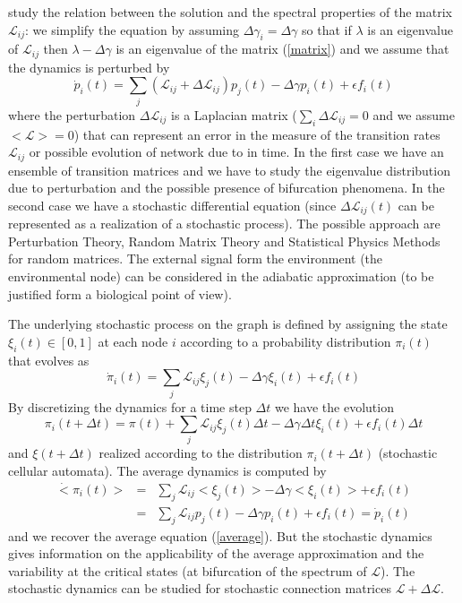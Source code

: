 study the relation between the solution and the spectral properties of the matrix $\mathcal{L}_{ij}$: we simplify the
equation by assuming $\Delta \gamma_i=\Delta \gamma$ so that if $\lambda$ is an eigenvalue of $\mathcal{L}_{ij}$
then $\lambda-\Delta \gamma$ is an eigenvalue of the matrix (\ref{matrix}) and we assume that the dynamics
is perturbed by
\begin{equation}
\dot p_i(t)=\sum_j\left ( \mathcal{L}_{ij}+\Delta \mathcal{L}_{ij}\right ) p_j(t)-\Delta \gamma p_i(t)+\epsilon f_i(t)
\label{average_p}
\end{equation}
where the perturbation $\Delta\mathcal{L}_{ij}$ is a Laplacian matrix ($\sum_i \Delta\mathcal{L}_{ij}=0$ and we
assume $<\mathcal{L}>=0$) that can
represent an error in the measure of the transition rates $\mathcal{L}_{ij}$ or possible evolution of network due to
in time. In the first case we have an ensemble of transition matrices and we have to study the eigenvalue distribution
due to perturbation and the possible presence of bifurcation phenomena. In the second case we have a stochastic 
differential equation (since $\Delta \mathcal{L}_{ij}(t)$ can be represented as a realization of a stochastic process).
The possible approach are Perturbation Theory, Random Matrix Theory and Statistical Physics Methods for random matrices.
The external signal form the environment  (the environmental node) can be considered in the adiabatic approximation
(to be justified form a biological point of view).\par\noindent
The underlying stochastic process on the graph is defined by assigning the state $\xi_i(t)\in [0,1]$ at each node $i$ according 
to a probability distribution $\pi_i(t)$ that evolves as
$$
\dot \pi_i(t)=\sum_j \mathcal{L}_{ij}\xi_j(t)-\Delta \gamma \xi_i(t)+\epsilon f_i(t)
$$
By discretizing the dynamics for a time step $\Delta t$ we have the evolution
$$
\pi_i(t+\Delta t)=\pi(t)+\sum_j \mathcal{L}_{ij}\xi_j(t)\Delta t-\Delta \gamma \Delta t\xi_i(t)+\epsilon f_i(t)\Delta t
$$
and $\xi(t+\Delta t)$ realized according to the distribution $\pi_i(t+\Delta t)$ (stochastic cellular automata).
The average dynamics is computed by
\begin{eqnarray}
\dot <\pi_i(t)>&=&\sum_j \mathcal{L}_{ij}<\xi_j(t)>-\Delta \gamma <\xi_i(t)>+\epsilon f_i(t)\nonumber \\
&=&\sum_j \mathcal{L}_{ij}p_j(t)-\Delta \gamma p_i(t)+\epsilon f_i(t)=\dot p_i(t)\nonumber
\end{eqnarray}
and we recover the average equation (\ref{average}). But the stochastic dynamics gives information on the applicability
of the average approximation and the variability at the critical states (at bifurcation of the spectrum of $\mathcal{L}$).
The stochastic dynamics can be studied for stochastic connection matrices $\mathcal{L}+\Delta \mathcal{L}$.


